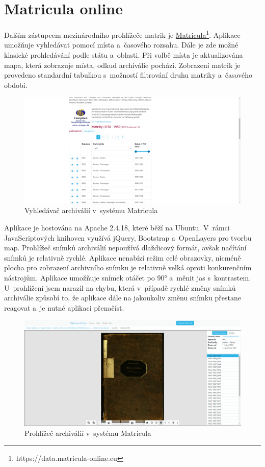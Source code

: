 \newpage
\section{Matricula online}
Dalším zástupcem mezinárodního prohlížeče matrik je \href{https://data.matricula-online.eu}{Matricula}\footnote{https://data.matricula-online.eu}. Aplikace umožňuje vyhledávat pomocí místa a~časového rozsahu. Dále je zde možné klasické prohledávání podle státu a~oblasti. Při volbě místa je aktualizována mapa, která zobrazuje místa, odkud archiválie pochází. Zobrazení matrik je provedeno standardní tabulkou s~možností filtrování druhu matriky a~časového období.

\begin{figure}[htbp]
\centering
    \includegraphics[scale=.2]{obrazky-figures/archives/matricula/vyhledani.png}
    \caption{Vyhledávač archiválií v~systému Matricula}
\end{figure}

\noindent
Aplikace je hostována na Apache 2.4.18, které běží na Ubuntu. V~rámci JavaScriptových knihoven využívá jQuery, Bootstrap a~OpenLayers pro tvorbu map. 
\newpara
Prohlížeč snímků archiválií nepoužívá dlaždicový formát, avšak načítání snímků je relativně rychlé. Aplikace nenabízí režim celé obrazovky, nicméně plocha pro zobrazení archivního snímku je relativně velká oproti konkurenčním nástrojům. Aplikace umožňuje snímek otáčet po 90° a~měnit jas s~kontrastem. U~prohlížení jsem narazil na chybu, která v~případě rychlé změny snímků archiválie způsobí to, že aplikace dále na jakoukoliv změnu snímku přestane reagovat a~je nutné aplikaci přenačíst.

\begin{figure}[htbp]
\centering
    \includegraphics[scale=.2]{obrazky-figures/archives/matricula/prohlizec.png}
    \caption{Prohlížeč archiválií v~systému Matricula}
\end{figure}
\newpage

